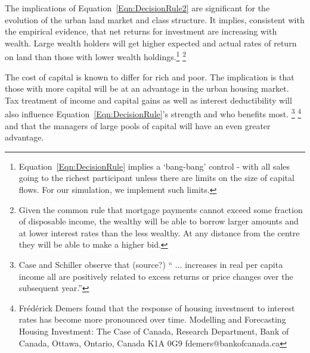 The implications of {\color{red} Equation~\ref{Eqn:DecisionRule2}} are significant for the evolution of the urban land market and class structure. It implies, consistent with the empirical evidence, that net returns for investment are increasing with wealth. Large wealth holders will get higher expected and actual rates of return on land than those with  lower wealth holdings.\footnote{ Equation~\ref{Eqn:DecisionRule} implies a `bang-bang' control - with all sales going to the richest participant unless there are limits on the size of capital flows. For our simulation, we implement such limits. } \footnote{Given the  common rule that mortgage payments cannot exceed some fraction of disposable income, the wealthy will be able to borrow larger amounts and at lower interest rates than the less wealthy. At any distance from the centre they will be able to make a higher bid.}

The cost of capital is known to differ for rich and poor. The implication is that those with more capital will be at an advantage in the urban housing  market. Tax treatment of income and capital gains as well as interest deductibility will also influence Equation~\ref{Eqn:DecisionRule}'s strength and who benefits most. \footnote{Case and Schiller observe that (source?) 
`` ... increases in real per capita income all are positively related to excess returns or price changes over the subsequent year.''} 
\footnote{Fr\'ed\'erick Demers found that the response of housing investment to interest rates has become more pronounced over time. Modelling and Forecasting Housing Investment: The Case of Canada,  Research Department, Bank of Canada, Ottawa, Ontario, Canada K1A 0G9 fdemers@bankofcanada.ca} 
and that the managers of large pools of capital will have an even greater advantage. 
 

